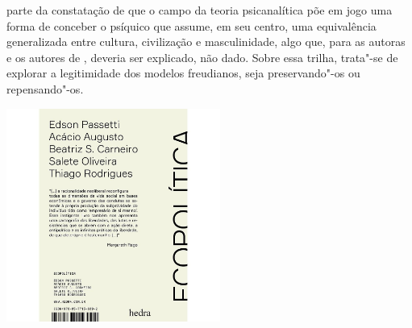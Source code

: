 \hspace*{-7cm}\hrulefill\hspace*{-7cm}

\medskip

 parte da constatação de que o campo da teoria psicanalítica põe em jogo uma forma de conceber o psíquico que assume, em seu centro, uma equivalência generalizada entre cultura, civilização e masculinidade, algo que, para as autoras e os autores de {}, deveria ser explicado, não dado. Sobre essa trilha, trata"-se de explorar a legitimidade dos modelos freudianos, seja preservando"-os ou repensando"-os.

\vfill

\hspace*{-.4cm}\begin{minipage}[c]{1\linewidth}
\small{
{}}
\end{minipage}

\pagebreak

\hspace{.5cm}

\begin{center}
\hspace*{-1cm}
\hspace*{1cm}\includegraphics[width=70mm]{./eco.jpeg}
\end{center}

